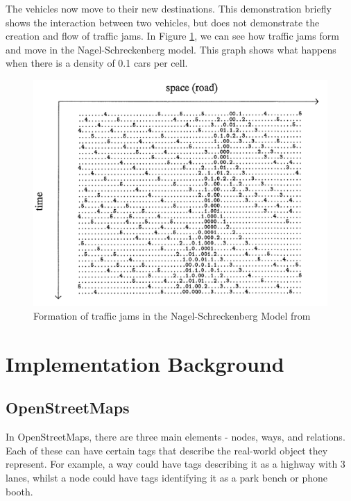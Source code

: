 \documentclass[ %
                    author={Alexander Hill},
                supervisor={Dr. Benjamin Sach},
                    degree={MEng},
                     title={MARMOSET},
                  subtitle={Multi-Agent Route Management using Online Simulation for Efficient Transportation},
                      type={research},
                      year={2016} ]{dissertation}
\begin{document}
\begin{figure}[!h]
\centering
{}
\end{figure}

The vehicles now move to their new destinations. This demonstration briefly
shows the interaction between two vehicles, but does not demonstrate the
creation and flow of traffic jams. In Figure \ref{nagel-demo}, we can see how
traffic jams form and move in the Nagel-Schreckenberg model. This graph shows
what happens when there is a density of 0.1 cars per cell.

\begin{figure}[h]
    \centering
    \includegraphics[scale=0.4]{nagel}
    \caption{Formation of traffic jams in the Nagel-Schreckenberg Model
    from~\cite{nagel}}\label{nagel-demo}
\end{figure}

\section{Implementation Background}

\subsection{OpenStreetMaps}

In OpenStreetMaps, there are three main elements - nodes, ways, and relations.
Each of these can have certain tags that describe the real-world object they
represent. For example, a way could have tags describing it as a highway with 3
lanes, whilst a node could have tags identifying it as a park bench or phone
booth.
\end{document}
